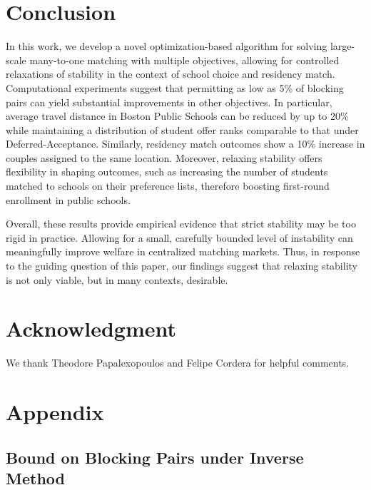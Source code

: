\documentclass[11pt]{article}
\newtheorem{assumption}{Assumption}
\begin{document}
\section{Conclusion}
In this work, we develop a novel optimization-based algorithm for solving large-scale many-to-one matching with multiple objectives, allowing for controlled relaxations of stability in the context of school choice and residency match. Computational experiments suggest that permitting as low as 5\% of blocking pairs can yield substantial improvements in other objectives. In particular, average travel distance in Boston Public Schools can be reduced by up to 20\% while maintaining a distribution of student offer ranks comparable to that under Deferred-Acceptance. Similarly, residency match outcomes show a 10\% increase in couples assigned to the same location. Moreover, relaxing stability offers flexibility in shaping outcomes, such as increasing the number of students matched to schools on their preference lists, therefore boosting first-round enrollment in public schools. 

Overall, these results provide empirical evidence that strict stability may be too rigid in practice. Allowing for a small, carefully bounded level of instability can meaningfully improve welfare in centralized matching markets. Thus, in response to the guiding question of this paper, our findings suggest that relaxing stability is not only viable, but in many contexts, desirable.

\section{Acknowledgment}
We thank Theodore Papalexopoulos and Felipe Cordera for helpful comments.

\appendix 
\section{Appendix}
\subsection{Bound on Blocking Pairs under Inverse Method} \label{appendix:gap_bound}
\end{document}
